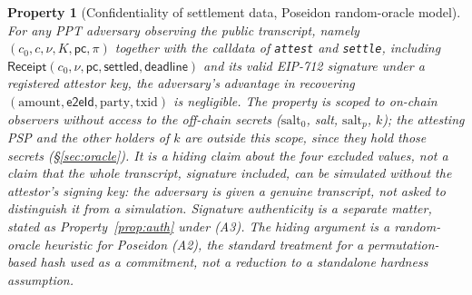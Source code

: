 \documentclass[11pt]{article}
\newtheorem{property}{Property}
\newcommand{\eeid}{\ensuremath{\mathsf{e2eId}}}
\newcommand{\code}[1]{\texttt{#1}}
\begin{document}
\begin{property}[Confidentiality of settlement data, Poseidon random-oracle model]
\label{prop:conf}
For any PPT adversary observing the public transcript, namely
$(c_0,c,\nu,K,\mathsf{pc},\pi)$ \emph{together with the calldata of}
\code{attest} \emph{and} \code{settle}, including
$\mathsf{Receipt}(c_0,\allowbreak\nu,\allowbreak\mathsf{pc},\allowbreak\mathsf{settled},\allowbreak\mathsf{deadline})$
and its valid EIP-712 signature under a registered attestor key, the
adversary's advantage in recovering $(\text{amount},\eeid,\text{party},\text{txid})$
is negligible. The property is scoped to \emph{on-chain observers without
access to the off-chain secrets} ($\text{salt}_0$, salt, $\text{salt}_p$, $k$);
the attesting PSP and the other holders of $k$ are outside this scope, since
they hold those secrets (\S\ref{sec:oracle}). It is a \emph{hiding} claim about
the four excluded values, not a claim that the whole transcript, signature
included, can be simulated without the attestor's signing key: the adversary is
given a genuine transcript, not asked to distinguish it from a simulation.
Signature \emph{authenticity} is a separate matter, stated as
Property~\ref{prop:auth} under (A3). The hiding argument is a random-oracle
heuristic for Poseidon (A2), the standard treatment for a permutation-based hash
used as a commitment, not a reduction to a standalone hardness assumption.
\end{property}
\end{document}
